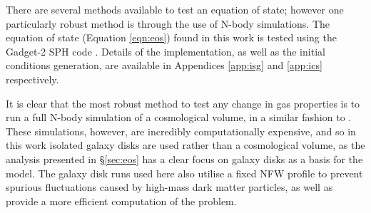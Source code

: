 There are several methods available to test an equation of state; however one particularly robust method is through the use of N-body simulations.
The equation of state (Equation \ref{eqn:eos}) found in this work is tested using the Gadget-2 SPH code \citep{springel_cosmological_2005}.
Details of the implementation, as well as the initial conditions generation, are available in Appendices \ref{app:isg} and \ref{app:ics} respectively.

It is clear that the most robust method to test any change in gas properties is to run a full N-body simulation of a cosmological volume, in a similar fashion to \citet{schaye2015, volksberger2014}.
These simulations, however, are incredibly computationally expensive, and so in this work isolated galaxy disks are used rather than a cosmological volume, as the analysis presented in \S \ref{sec:eos} has a clear focus on galaxy disks as a basis for the model.
The galaxy disk runs used here also utilise a fixed NFW profile \citep{coe_dark_2010, navarro_structure_1996} to prevent spurious fluctuations caused by high-mass dark matter particles, as well as provide a more efficient computation of the problem.
